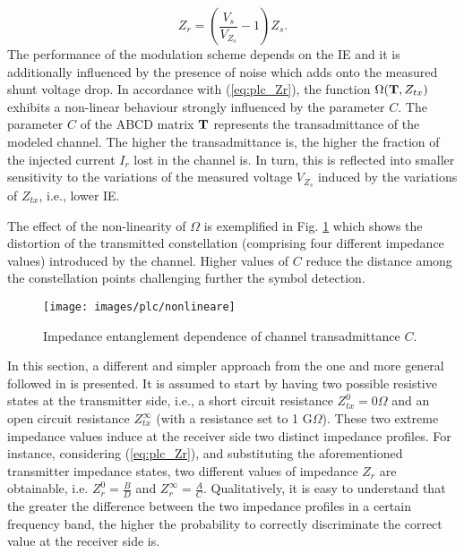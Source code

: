 \begin{equation}
	Z_{r} = \left(\frac{V_s}{V_{Z_s}}-1\right)Z_s.
	\label{eq:plc_ZrV}
\end{equation}
The performance of the modulation scheme depends on the IE and it is additionally influenced by the presence of noise which adds onto the measured shunt voltage drop.  In accordance with (\ref{eq:plc_Zr}), the function $\Omega(\bold{T},Z_{tx})$ exhibits a non-linear behaviour strongly influenced by the parameter $C$. The parameter $C$ of the ABCD matrix $\bold{T}$ represents the transadmittance of the modeled channel. The higher the transadmittance is, the higher the fraction of the injected current $I_r$ lost in the channel is. In turn, this is reflected into smaller sensitivity to the variations of the measured voltage $V_{Z_s}$ induced by the variations of $Z_{tx}$, i.e., lower IE.

The effect of the non-linearity of $\Omega$ is exemplified in Fig. \ref{fig:plc_nonlineare} which shows the distortion of the transmitted constellation (comprising four different impedance values) introduced by the channel. Higher values of $C$ reduce the distance among the constellation points challenging further the symbol detection.
  \begin{figure}
  	\texttt{[image: images/plc/nonlineare]}
  	\caption{Impedance entanglement dependence of channel transadmittance $C$.}
  	\label{fig:plc_nonlineare}
  \end{figure}

In this section, a different and simpler approach from the one and more general followed in \cite{TonelloIsplc2020} is presented.
It is assumed to start by having two possible resistive states at the transmitter side, i.e., a short circuit resistance $Z_{tx}^{0}=0 \Omega$ and an open circuit resistance $Z_{tx}^{\infty}$ (with a resistance set to 1 G$\Omega$). These two extreme impedance values induce at the receiver side two distinct impedance profiles. For instance, considering (\ref{eq:plc_Zr}), and substituting the aforementioned transmitter impedance states, two different values of impedance $Z_r$ are obtainable, i.e. $Z_r^{0} = \frac{B}{D}$ and $Z_r^{\infty} = \frac{A}{C}$.
Qualitatively, it is easy to understand that the greater the difference between the two impedance profiles in a certain frequency band, the higher the probability to correctly discriminate the correct value at the receiver side is.

